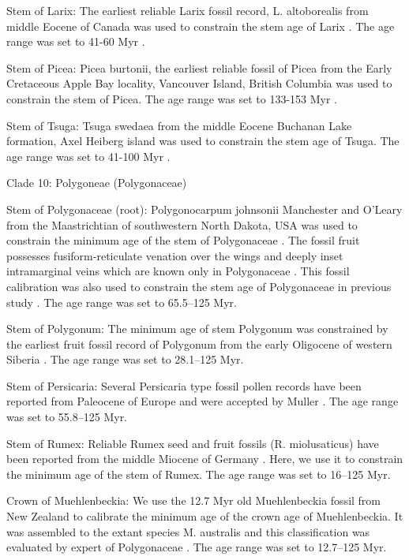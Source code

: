 \documentclass[10pt]{article}
\begin{document}
Stem of Larix: The earliest reliable Larix fossil record,
L. altoborealis from middle Eocene of Canada was used to constrain the
stem age of Larix \citep{LePage1991}. The age range was
set to 41-60 Myr \citep{Leslie2012}. 

Stem of Picea: Picea burtonii, the earliest reliable fossil of Picea
from the Early Cretaceous Apple Bay locality, Vancouver Island,
British Columbia \citep{Klymiuk2012} was used to constrain the stem of
Picea.  The age range was set to 133-153 Myr \citep{Leslie2012}.

Stem of Tsuga: Tsuga swedaea from the middle Eocene Buchanan Lake
formation, Axel Heiberg island \citep{Lepage2003} was used to
constrain the stem age of Tsuga. The age range was set to 41-100 Myr
\citep{Leslie2012}.

Clade 10: Polygoneae (Polygonaceae)

Stem of Polygonaceae (root): Polygonocarpum johnsonii Manchester and
O’Leary from the Maastrichtian of southwestern North Dakota, USA was
used to constrain the minimum age of the stem of Polygonaceae
\citep{Manchester2010}. The fossil fruit possesses fusiform-reticulate
venation over the wings and deeply inset intramarginal veins which are
known only in Polygonaceae \citep{Manchester2010}. This fossil
calibration was also used to constrain the stem age of Polygonaceae in
previous study \citep{Magallon2015}. The age range was set to
65.5--125 Myr.

Stem of Polygonum: The minimum age of stem Polygonum was constrained
by the earliest fruit fossil record of Polygonum from the early
Oligocene of western Siberia \citep{Dorofeev1963}. The age range was
set to 28.1--125 Myr.

Stem of Persicaria: Several Persicaria type fossil pollen records have
been reported from Paleocene of Europe \citep{Krutzsch1970,Gruas1978}
and were accepted by Muller \citep{Muller1981}. The age range was set
to 55.8--125 Myr.

Stem of Rumex: Reliable Rumex seed and fruit fossils (R. miolusaticus)
have been reported from the middle Miocene of Germany
\citep{Mai2001}. Here, we use it to constrain the minimum age of the
stem of Rumex. The age range was set to 16--125 Myr.

Crown of Muehlenbeckia: We use the 12.7 Myr old Muehlenbeckia fossil
from New Zealand \citep{Pole1993} to calibrate the minimum age of the
crown age of Muehlenbeckia. It was assembled to the extant species
M. australis \citep{Pole1993} and this classification was evaluated by
expert of Polygonaceae \citep{Schuster2013}. The age range was set to
12.7--125 Myr.
\end{document}
